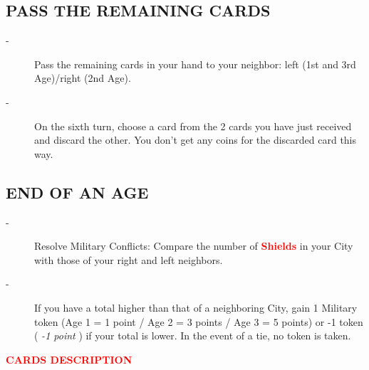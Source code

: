 \documentclass{scrartcl}%
\begin{document}
%
\subsection{ PASS THE REMAINING CARDS
}%
\label{subsec:PASSTHEREMAININGCARDS}%
\begin{description}%
\item[{-} ]%
%
 Pass the remaining cards in your hand to your neighbor: left (1st and 3rd Age)/right (2nd Age).
%
\item[{-} ]%
%
 On the sixth turn, choose a card from the 2 cards you have just received and discard the other. You don't get any coins for the discarded card this way.
%
\end{description}

%
\subsection{ END OF AN AGE
}%
\label{subsec:ENDOFANAGE}%
\begin{description}%
\item[{-} ]%
%
 Resolve Military Conflicts: Compare the number of %
\textcolor{red}{%
\textbf{Shields}%
}%
\textit{ }%
 in your City with those of your right and left neighbors.
%
\item[{-} ]%
%
 If you have a total higher than that of a neighboring City, gain 1 Military token (Age 1 = 1 point / Age 2 = 3 points / Age 3 = 5 points) or {-}1 token (%
\textit{{-}1 point}%
\textit{ }%
 ) if your total is lower. In the event of a tie, no token is taken.
%
\end{description}%
\textcolor{red}{%
\textbf{CARDS DESCRIPTION}%
}%
\end{document}
